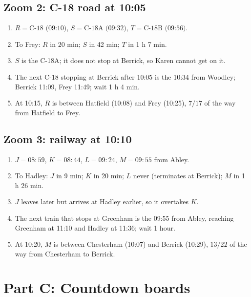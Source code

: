 \documentclass[11pt,a4paper]{article}
\begin{document}
\subsection*{Zoom 2: C-18 road at 10:05}
\begin{enumerate}[label=\textbf{\alph*)},leftmargin=*]
\item \(R=\text{C-18 (09:10)}\), \(S=\text{C-18A (09:32)}\), \(T=\text{C-18B (09:56)}\).
\item To Frey: \(R\) in 20 min; \(S\) in 42 min; \(T\) in 1 h 7 min.
\item \(S\) is the C-18A; it does not stop at Berrick, so Karen cannot get on it.
\item The next C-18 stopping at Berrick after 10:05 is the 10:34 from Woodley; Berrick 11:09, Frey 11:49; wait 1 h 4 min.
\item At 10:15, \(R\) is between Hatfield (10:08) and Frey (10:25), \(7/17\) of the way from Hatfield to Frey.
\end{enumerate}

\subsection*{Zoom 3: railway at 10:10}
\begin{enumerate}[label=\textbf{\alph*)},leftmargin=*]
\item \(J=08{:}59\), \(K=08{:}44\), \(L=09{:}24\), \(M=09{:}55\) from Abley.
\item To Hadley: \(J\) in 9 min; \(K\) in 20 min; \(L\) never (terminates at Berrick); \(M\) in 1 h 26 min.
\item \(J\) leaves later but arrives at Hadley earlier, so it overtakes \(K\).
\item The next train that stops at Greenham is the 09:55 from Abley, reaching Greenham at 11:10 and Hadley at 11:36; wait 1 hour.
\item At 10:20, \(M\) is between Chesterham (10:07) and Berrick (10:29), \(13/22\) of the way from Chesterham to Berrick.
\end{enumerate}

\section*{Part C: Countdown boards}
\end{document}
